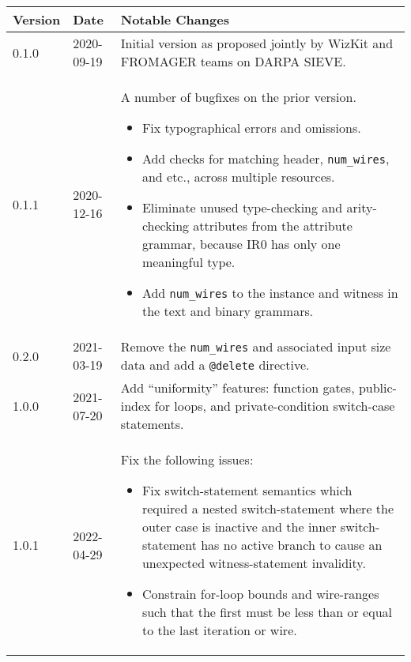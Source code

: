 \documentclass[12pt]{article}
\begin{document}
\begin{tabularx}{\textwidth}{|p{1in}|p{1in}|p{4in}|}
  \hline
  \textbf{Version} & \textbf{Date} & \textbf{Notable Changes}                                                                                                                                                                   \\
  \hline
  0.1.0            & 2020-09-19    & Initial version as proposed jointly by WizKit and FROMAGER teams on DARPA SIEVE.                                                                                                           \\
  \hline
  0.1.1
                   & 2020-12-16    & A number of bugfixes on the prior version.
  \begin{itemize}
    \item Fix typographical errors and omissions.
    \item Add checks for matching header, \texttt{num\_wires}, and etc., across multiple resources.
    \item Eliminate unused type-checking and arity-checking attributes from the attribute grammar, because IR0 has only one meaningful type.
    \item Add \texttt{num\_wires} to the instance and witness in the text and binary grammars.
  \end{itemize}                                                                                       \\
  \hline
  0.2.0            & 2021-03-19    & Remove the \texttt{num\_wires} and associated input size data and add a \texttt{@delete} directive.                                                                                        \\
  \hline
  1.0.0            & 2021-07-20    & Add ``uniformity'' features: function gates, public-index for loops, and private-condition switch-case statements.                                                                         \\
  \hline
  1.0.1            & 2022-04-29    & Fix the following issues:
  \begin{itemize}
    \item Fix switch-statement semantics which required a nested switch-statement where the outer case is inactive and the inner switch-statement has no active branch to cause an unexpected witness-statement invalidity.
    \item Constrain for-loop bounds and wire-ranges such that the first must be less than or equal to the last iteration or wire.

\end{itemize}
\end{tabularx}
\end{document}
